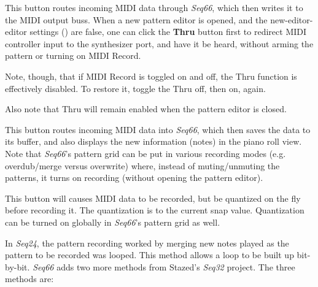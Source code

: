    This button routes incoming MIDI data through
   \textsl{Seq66}, which then writes it to the MIDI output buss.
   When a new pattern editor is opened,
   and the new-editor-editor settings
   ()
   are false, one can click the
   \textbf{Thru} button first to redirect MIDI controller input
   to the synthesizer port, and have it be heard, without
   arming the pattern or turning on MIDI Record.

   Note, though, that if MIDI Record is toggled on and off, the
   Thru function is effectively disabled.  To restore it,
   toggle the Thru off, then on, again.

   Also note that Thru will remain enabled when the pattern editor is closed.

   This button routes incoming MIDI data into
   \textsl{Seq66}, which then saves the data to its buffer, and also
   displays the new information (notes) in the piano roll view.
   Note that \textsl{Seq66}'s pattern grid can be put in various recording
   modes (e.g. overdub/merge versus overwrite) where, instead of
   muting/unmuting the patterns, it turns on recording (without opening the
   pattern editor).

   This button will causes MIDI data to be recorded, but be
   quantized on the fly before recording it.
   The quantization is to the current snap value.
   Quantization can be turned on globally in \textsl{Seq66}'s pattern grid
   as well.

   In \textsl{Seq24}, the pattern recording worked by merging new notes played
   as the pattern to be recorded was looped.  This method allows a loop to be
   built up bit-by-bit.  \textsl{Seq66} adds two more methods from
   Stazed's \textsl{Seq32} project.  The three methods are:

